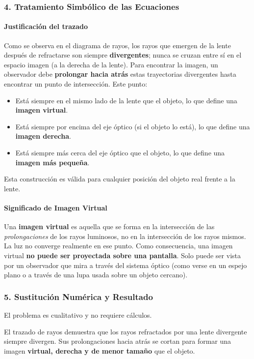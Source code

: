 \subsubsection*{4. Tratamiento Simbólico de las Ecuaciones}
\paragraph*{Justificación del trazado}
Como se observa en el diagrama de rayos, los rayos que emergen de la lente después de refractarse son siempre \textbf{divergentes}; nunca se cruzan entre sí en el espacio imagen (a la derecha de la lente).
Para encontrar la imagen, un observador debe \textbf{prolongar hacia atrás} estas trayectorias divergentes hasta encontrar un punto de intersección. Este punto:
\begin{itemize}
    \item Está siempre en el mismo lado de la lente que el objeto, lo que define una \textbf{imagen virtual}.
    \item Está siempre por encima del eje óptico (si el objeto lo está), lo que define una \textbf{imagen derecha}.
    \item Está siempre más cerca del eje óptico que el objeto, lo que define una \textbf{imagen más pequeña}.
\end{itemize}
Esta construcción es válida para cualquier posición del objeto real frente a la lente.

\paragraph*{Significado de Imagen Virtual}
Una \textbf{imagen virtual} es aquella que se forma en la intersección de las \textit{prolongaciones} de los rayos luminosos, no en la intersección de los rayos mismos. La luz no converge realmente en ese punto. Como consecuencia, una imagen virtual \textbf{no puede ser proyectada sobre una pantalla}. Solo puede ser vista por un observador que mira a través del sistema óptico (como verse en un espejo plano o a través de una lupa usada sobre un objeto cercano).

\subsubsection*{5. Sustitución Numérica y Resultado}
El problema es cualitativo y no requiere cálculos.
\begin{cajaresultado}
    El trazado de rayos demuestra que los rayos refractados por una lente divergente siempre divergen. Sus prolongaciones hacia atrás se cortan para formar una imagen \textbf{virtual, derecha y de menor tamaño} que el objeto.
\end{cajaresultado}


